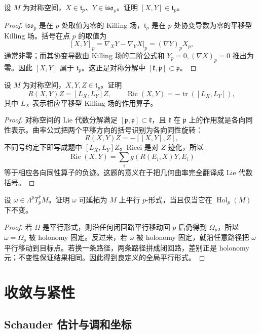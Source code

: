 \documentclass[11pt,a4paper,openany]{ctexbook}
\numberwithin{equation}{chapter}
\begin{document}
\begin{exercise}
设 \(M\) 为对称空间，\(X\in\mathfrak t_p\)、\(Y\in\mathfrak{iso}_p\)。证明 \([X,Y]\in\mathfrak t_p\)。
\end{exercise}
\begin{proof}
\(\mathfrak{iso}_p\) 是在 \(p\) 处取值为零的 Killing 场，\(\mathfrak t_p\) 是在 \(p\) 处协变导数为零的平移型 Killing 场。括号在点 \(p\) 的取值为
\[
[X,Y]_p=\nabla_XY-\nabla_YX|_p=(\nabla Y)_pX_p,
\]
通常非零；而其协变导数由 Killing 场的二阶公式和 \(Y_p=0,(\nabla X)_p=0\) 推出为零。因此 \([X,Y]\) 属于 \(\mathfrak t_p\)。这正是对称分解中 \([\mathfrak k,\mathfrak p]\subset\mathfrak p\)。
\end{proof}

\begin{exercise}
设 \(M\) 为对称空间，\(X,Y,Z\in\mathfrak t_p\)。证明
\[
R(X,Y)Z=[L_X,L_Y]Z,\qquad \operatorname{Ric}(X,Y)=-\operatorname{tr}([L_X,L_Y]),
\]
其中 \(L_X\) 表示相应平移型 Killing 场的作用算子。
\end{exercise}
\begin{proof}
对称空间的 Lie 代数分解满足 \([\mathfrak p,\mathfrak p]\subset\mathfrak k\)，且 \(\mathfrak k\) 在 \(\mathfrak p\) 上的作用就是各向同性表示。曲率公式把两个平移方向的括号识别为各向同性旋转：
\[
R(X,Y)Z=-[[X,Y],Z],
\]
不同号约定下即写成题中 \([L_X,L_Y]Z\)。Ricci 是对 \(Z\) 迹化，所以
\[
\operatorname{Ric}(X,Y)=\sum_i g(R(E_i,X)Y,E_i)
\]
等于相应各向同性算子的负迹。这题的意义在于把几何曲率完全翻译成 Lie 代数括号。
\end{proof}

\begin{exercise}
设 \(\omega\in\Lambda^pT_p^*M\)。证明 \(\omega\) 可延拓为 \(M\) 上平行 \(p\)-形式，当且仅当它在 \(\operatorname{Hol}_p(M)\) 下不变。
\end{exercise}
\begin{proof}
若 \(\Omega\) 是平行形式，则沿任何闭回路平行移动回 \(p\) 后仍得到 \(\Omega_p\)，所以 \(\omega=\Omega_p\) 被 holonomy 固定。反过来，若 \(\omega\) 被 holonomy 固定，就沿任意路径把 \(\omega\) 平行移动到目标点。若换一条路径，两条路径拼成闭回路，差别正是 holonomy 元；不变性保证结果相同。因此得到良定义的全局平行形式。
\end{proof}
\chapter{收敛与紧性}

\section{Schauder 估计与调和坐标}
\end{document}
